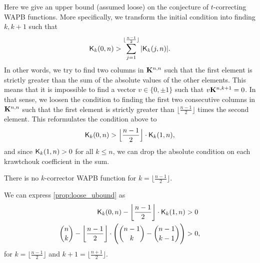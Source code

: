 Here we give an upper bound (assumed loose) on the conjecture of $t$-correcting WAPB functions. More specifically, we transform the initial condition into finding $k, k+1$ such that
$$
\mathsf{K}_{k}(0,n) > \sum_{j = 1}^{\lfloor\frac{n-1}{2}\rfloor}|\mathsf{K}_{k}(j,n)|.
$$
In other words, we try to find two columns in $\mathbf{K}^{n,n}$ such that the first element is strictly greater than the sum of the absolute values of the other elements.
This means that it is impossible to find a vector $v \in \{0,\pm1\}$ such that $v\mathbf{K}^{n,k+1} = 0$.
In that sense, we loosen the condition to finding the first two consecutive columns in $\mathbf{K}^{n,n}$ such that the first element is strictly greater than $\lfloor \frac{n-1}{2} \rfloor$ times the second element.
This reformulates the condition above to
$$
\mathsf{K}_{k}(0,n) > \Big\lfloor \frac{n-1}{2} \Big\rfloor \cdot \mathsf{K}_{k}(1,n),
$$
and since $\mathsf{K}_{k}(1,n) > 0$ for all $k \leq n$, we can drop the absolute condition on each krawtchouk coefficient in the sum.

\begin{proposition}\label{prop:loose_ubound}
There is no $k$-corrector WAPB function for $k = \big\lfloor \frac{n - 1}{2}\big\rfloor$.
\end{proposition}


We can express \cref{prop:loose_ubound} as
\begin{equation*}
\begin{split}
\mathsf{K}_{k}(0,n) - \bigg\lfloor\frac{n - 1}{2}\bigg\rfloor \cdot \mathsf{K}_{k}(1,n) &> 0\\
\binom{n}{k} - \bigg\lfloor\frac{n - 1}{2}\bigg\rfloor\cdot\Bigg(\binom{n - 1}{k} - \binom{n - 1}{k - 1}\Bigg) &> 0,\\
\end{split}
\end{equation*}
for $k = \big\lfloor \frac{n - 1}{2}\big\rfloor$ and $k+1 = \big\lfloor \frac{n + 1}{2}\big\rfloor$.

